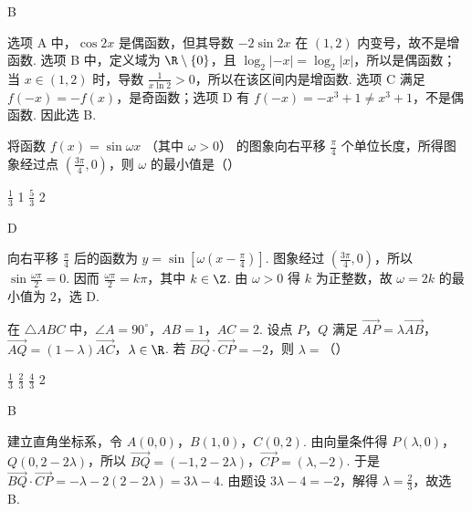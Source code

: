 \begin{answer}
B
\end{answer}

\begin{solution}
选项 A 中，\(\cos2x\) 是偶函数，但其导数 \(-2\sin2x\) 在 \((1,2)\) 内变号，故不是增函数. 选项 B 中，定义域为 \(\R\mathbin{\backslash}\{0\}\)，且 \(\log_2|-x|=\log_2|x|\)，所以是偶函数；当 \(x\in(1,2)\) 时，导数 \(\frac{1}{x\ln2}>0\)，所以在该区间内是增函数. 选项 C 满足 \(f(-x)=-f(x)\)，是奇函数；选项 D 有 \(f(-x)=-x^3+1\ne x^3+1\)，不是偶函数. 因此选 B.
\end{solution}

\begin{problem}
将函数 \( f(x) = \sin \omega x \) （其中 \( \omega > 0 \)） 的图象向右平移 \( \frac{\pi}{4} \) 个单位长度，所得图象经过点 \( \left(\frac{3\pi}{4}, 0\right) \)，则 \( \omega \) 的最小值是（\quad）

\choices
    {\( \frac{1}{3} \)}
    {1}
    {\( \frac{5}{3} \)}
    {2}
\end{problem}

\begin{answer}
D
\end{answer}

\begin{solution}
向右平移 \(\frac{\pi}{4}\) 后的函数为 \(y=\sin\left[\omega\left(x-\frac{\pi}{4}\right)\right]\). 图象经过 \(\left(\frac{3\pi}{4},0\right)\)，所以 \(\sin\frac{\omega\pi}{2}=0\). 因而 \(\frac{\omega\pi}{2}=k\pi\)，其中 \(k\in\Z\). 由 \(\omega>0\) 得 \(k\) 为正整数，故 \(\omega=2k\) 的最小值为 \(2\)，选 D.
\end{solution}

\begin{problem}
在 \(\triangle ABC\) 中，\(\angle A = 90^{\circ}\)，\(AB = 1\)，\(AC = 2\). 设点 \(P\)，\(Q\) 满足 \(\overrightarrow{AP} = \lambda \overrightarrow{AB}\)，\(\overrightarrow{AQ} = (1 - \lambda)\overrightarrow{AC}\)，\(\lambda \in \R\). 若 \(\overrightarrow{BQ} \cdot \overrightarrow{CP} = -2\)，则 \(\lambda =\)（\quad）

\choices
    {\( \frac{1}{3} \)}
    {\( \frac{2}{3} \)}
    {\( \frac{4}{3} \)}
    {2}
\end{problem}

\begin{answer}
B
\end{answer}

\begin{solution}
建立直角坐标系，令 \(A(0,0)\)，\(B(1,0)\)，\(C(0,2)\). 由向量条件得 \(P(\lambda,0)\)，\(Q(0,2-2\lambda)\)，所以 \(\overrightarrow{BQ}=(-1,2-2\lambda)\)，\(\overrightarrow{CP}=(\lambda,-2)\). 于是 \(\overrightarrow{BQ}\cdot\overrightarrow{CP}=-\lambda-2(2-2\lambda)=3\lambda-4\). 由题设 \(3\lambda-4=-2\)，解得 \(\lambda=\frac23\)，故选 B.
\end{solution}

